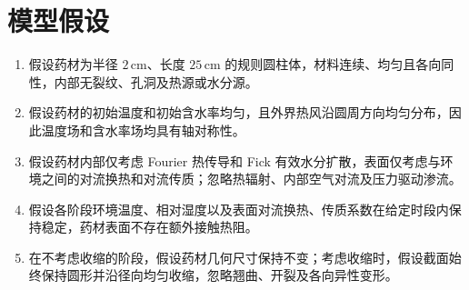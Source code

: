 \documentclass[12pt,a4paper,fontset=none]{ctexart}
\begin{document}
\section{模型假设}
\begin{enumerate}[
  label=\arabic*.,
  leftmargin=1.22cm,
  labelsep=0.28cm,
  itemsep=0.10cm,
  topsep=0pt,
  parsep=0pt
]

  \item 假设药材为半径 $2\,\mathrm{cm}$、长度 $25\,\mathrm{cm}$ 的规则圆柱体，材料连续、均匀且各向同性，内部无裂纹、孔洞及热源或水分源。

  \item 假设药材的初始温度和初始含水率均匀，且外界热风沿圆周方向均匀分布，因此温度场和含水率场均具有轴对称性。

  \item 假设药材内部仅考虑 Fourier 热传导和 Fick 有效水分扩散，表面仅考虑与环境之间的对流换热和对流传质；忽略热辐射、内部空气对流及压力驱动渗流。

  \item 假设各阶段环境温度、相对湿度以及表面对流换热、传质系数在给定时段内保持稳定，药材表面不存在额外接触热阻。

  \item 在不考虑收缩的阶段，假设药材几何尺寸保持不变；考虑收缩时，假设截面始终保持圆形并沿径向均匀收缩，忽略翘曲、开裂及各向异性变形。

\end{enumerate}
\end{document}
